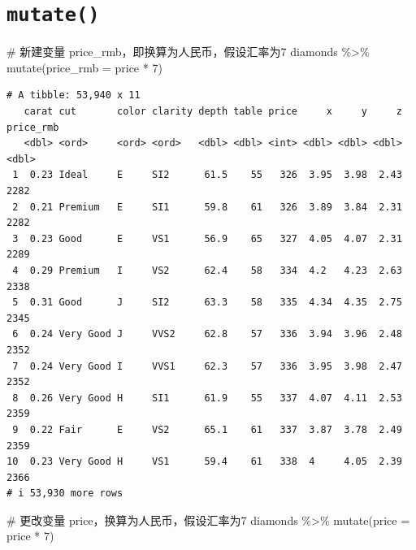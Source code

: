 \documentclass[
  letterpaper,
]{ctexbook}
\newenvironment{Shaded}{\begin{snugshade}}{\end{snugshade}}
\newcommand{\AttributeTok}[1]{\textcolor[rgb]{0.40,0.45,0.13}{#1}}
\newcommand{\CommentTok}[1]{\textcolor[rgb]{0.37,0.37,0.37}{#1}}
\newcommand{\DecValTok}[1]{\textcolor[rgb]{0.68,0.00,0.00}{#1}}
\newcommand{\FunctionTok}[1]{\textcolor[rgb]{0.28,0.35,0.67}{#1}}
\newcommand{\NormalTok}[1]{\textcolor[rgb]{0.00,0.23,0.31}{#1}}
\newcommand{\SpecialCharTok}[1]{\textcolor[rgb]{0.37,0.37,0.37}{#1}}
\begin{document}
\hypertarget{mutate}{%
\section{\texorpdfstring{\texttt{mutate()}}{mutate()}}\label{mutate}}

\begin{Shaded}
\begin{Highlighting}[]
\CommentTok{\# 新建变量 price\_rmb，即换算为人民币，假设汇率为7}
\NormalTok{diamonds }\SpecialCharTok{\%\textgreater{}\%}
  \FunctionTok{mutate}\NormalTok{(}\AttributeTok{price\_rmb =}\NormalTok{ price }\SpecialCharTok{*} \DecValTok{7}\NormalTok{)}
\end{Highlighting}
\end{Shaded}

\begin{verbatim}
# A tibble: 53,940 x 11
   carat cut       color clarity depth table price     x     y     z price_rmb
   <dbl> <ord>     <ord> <ord>   <dbl> <dbl> <int> <dbl> <dbl> <dbl>     <dbl>
 1  0.23 Ideal     E     SI2      61.5    55   326  3.95  3.98  2.43      2282
 2  0.21 Premium   E     SI1      59.8    61   326  3.89  3.84  2.31      2282
 3  0.23 Good      E     VS1      56.9    65   327  4.05  4.07  2.31      2289
 4  0.29 Premium   I     VS2      62.4    58   334  4.2   4.23  2.63      2338
 5  0.31 Good      J     SI2      63.3    58   335  4.34  4.35  2.75      2345
 6  0.24 Very Good J     VVS2     62.8    57   336  3.94  3.96  2.48      2352
 7  0.24 Very Good I     VVS1     62.3    57   336  3.95  3.98  2.47      2352
 8  0.26 Very Good H     SI1      61.9    55   337  4.07  4.11  2.53      2359
 9  0.22 Fair      E     VS2      65.1    61   337  3.87  3.78  2.49      2359
10  0.23 Very Good H     VS1      59.4    61   338  4     4.05  2.39      2366
# i 53,930 more rows
\end{verbatim}

\begin{Shaded}
\begin{Highlighting}[]
\CommentTok{\# 更改变量 price，换算为人民币，假设汇率为7}
\NormalTok{diamonds }\SpecialCharTok{\%\textgreater{}\%}
  \FunctionTok{mutate}\NormalTok{(}\AttributeTok{price =}\NormalTok{ price }\SpecialCharTok{*} \DecValTok{7}\NormalTok{)}
\end{Highlighting}
\end{Shaded}
\end{document}
